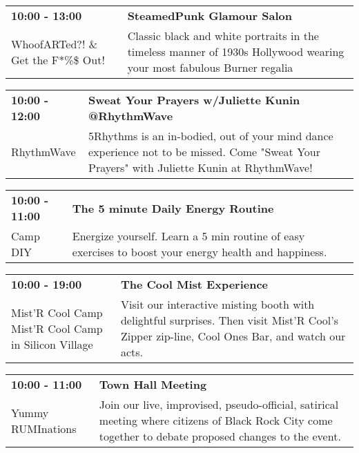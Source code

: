 \begin{tabular}{ p{1in} p{2.2in} }
    \textbf{10:00 - 13:00} & \textbf{SteamedPunk Glamour Salon} \\
    WhoofARTed?! \& Get the F*\%\$ Out! \newline  & Classic black and white portraits in the timeless manner of 1930s Hollywood wearing your most fabulous Burner regalia \\
    \hline 
\end{tabular}
    
\begin{tabular}{ p{1in} p{2.2in} }
    \textbf{10:00 - 12:00} & \textbf{Sweat Your Prayers w/Juliette Kunin @RhythmWave} \\
    RhythmWave \newline  & 5Rhythms is an in-bodied, out of your mind dance experience not to be missed. Come "Sweat Your Prayers" with Juliette Kunin at RhythmWave! \\
    \hline 
\end{tabular}
    
\begin{tabular}{ p{1in} p{2.2in} }
    \textbf{10:00 - 11:00} & \textbf{The 5 minute Daily Energy Routine} \\
    Camp DIY \newline  & Energize yourself. Learn a 5 min routine of easy exercises to boost your energy health and happiness. \\
    \hline 
\end{tabular}
    
\begin{tabular}{ p{1in} p{2.2in} }
    \textbf{10:00 - 19:00} & \textbf{The Cool Mist Experience} \\
    Mist'R Cool Camp \newline Mist'R Cool Camp in Silicon Village & Visit our interactive misting booth with delightful surprises. Then visit Mist'R Cool's Zipper zip-line, Cool Ones Bar, and watch our acts. \\
    \hline 
\end{tabular}
    
\begin{tabular}{ p{1in} p{2.2in} }
    \textbf{10:00 - 11:00} & \textbf{Town Hall Meeting} \\
    Yummy RUMInations \newline  & Join our live, improvised, pseudo-official, satirical meeting where citizens of Black Rock City come together to debate proposed changes to the event. \\
    \hline 
\end{tabular}
    

